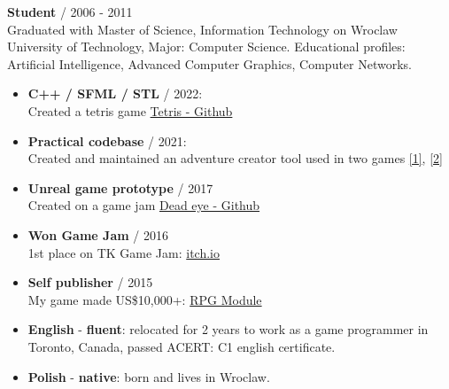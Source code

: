 \documentclass[12pt,a4paper]{article}
\begin{document}
\begin{multicols}{2}
\begin{samepage}
	\textbf{Student} / 2006 - 2011 \\
		Graduated with Master of Science, Information Technology on Wroclaw University of Technology, Major: Computer Science. Educational profiles: Artificial Intelligence, Advanced Computer Graphics, Computer Networks. \\

\end{samepage}

\vfill 



\begin{itemize}[leftmargin=7.0cm]
	\centering
	\section*{Works}
	\justifying
	\setlength\itemsep{0.0cm}
	\item[] \textbf{C++ / SFML / STL} / 2022: \\
		Created a tetris game {\href{https://github.com/kbobnis/tetris}{Tetris - Github}}
	\item[] \textbf{Practical codebase} / 2021: \\
		Created and maintained an adventure creator tool used in two games {\href{https://play.google.com/store/apps/details?id=games.dali.adventure.neighborhood.unholy}{[1]}}, {\href{https://play.google.com/store/apps/details?id=games.dali.adventure.reborn}{[2]}}
	\item[] \textbf{Unreal game prototype} / 2017  \\
		 Created on a game jam  {\href{https://github.com/kbobnis/2017.05-TSG-Compo---Dead-eye}{Dead eye - Github}}
	\item[] \textbf{Won Game Jam} / 2016   \\
		1st place on TK Game Jam: {\href{https://itch.io/jam/tk-game-jam-2016/results}{itch.io}} 
	\item[] \textbf{Self publisher} / 2015 \\
		 My game made US\$10,000+: {\href{https://play.google.com/store/apps/details?id=com.wyspianStudios.rpgModuleFull}{RPG Module}} 
\end{itemize}


\begin{itemize}[leftmargin=7.0cm]
	\centering	
	\section*{Languages }
	\justifying
	\setlength\itemsep{0.0cm}
	\item[] \textbf{English} - \textbf{fluent}: relocated for 2 years to work as a game programmer in Toronto, Canada, passed ACERT: C1 english certificate.
	\item[] \textbf{Polish} - \textbf{native}: born and lives in Wroclaw.
\end{itemize} 

\vfill

\end{multicols}
\end{document}
